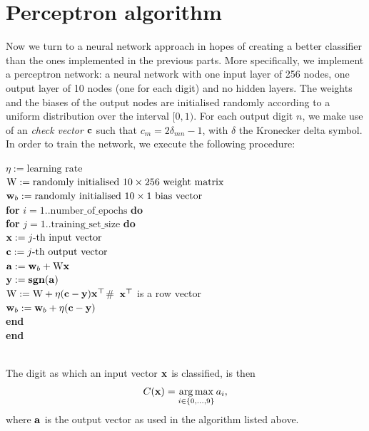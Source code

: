\documentclass[11pt]{article}
\DeclareMathOperator*{\argmax}{arg\,max}
\DeclareMathOperator{\vsgn}{{\bf sgn}}
\def\tab{\hspace*{1cm}}
\begin{document}
\section{Perceptron algorithm}
Now we turn to a neural network approach in hopes of creating a better classifier than the ones implemented in the previous parts. More specifically, we implement a perceptron network: a neural network with one input layer of 256 nodes, one output layer of 10 nodes (one for each digit) and no hidden layers. The weights and the biases of the output nodes are initialised randomly according to a uniform distribution over the interval $[0, 1)$. For each output digit $n$, we make use of an \textit{check vector} $\boldsymbol{\mathrm{c}}$ such that $c_m=2\delta_{mn}-1$, with $\delta$ the Kronecker delta symbol. In order to train the network, we execute the following procedure:\\
\sf
\begin{mdframed}
$\eta:=\text{learning rate}$\\
$\mathrm{W}:=\text{randomly initialised }10\times256\text{ weight matrix}$\\
$\boldsymbol{\mathrm{w}}_b:=\text{randomly initialised } 10\times1\text{ bias vector}$\\
\textbf{for} $i=1..\text{number\_of\_epochs}$ \textbf{do}\\
\tab\textbf{for} $j=1..\text{training\_set\_size}$ \textbf{do}\\
\tab\tab$\boldsymbol{\mathrm{x}}:=j\text{-th input vector}$\\
\tab\tab$\boldsymbol{\mathrm{c}}:=j\text{-th output vector}$\\
\tab\tab$\boldsymbol{\mathrm{a}}:=\boldsymbol{\mathrm{w}}_b+\mathrm{W}\boldsymbol{\mathrm{x}}$\\
\tab\tab$\vc{y}:=\vsgn(\vc{a})$\\
\tab\tab$\mathrm{W}:=\mathrm{W}+\eta(\boldsymbol{\mathrm{c}}-\boldsymbol{\mathrm{y}})\boldsymbol{\mathrm{x}}^{\boldsymbol\top}$\tab\#~$\boldsymbol{\mathrm{x}}^{\boldsymbol\top}$ is a row vector\\
\tab\tab$\boldsymbol{\mathrm{w}}_b:=\boldsymbol{\mathrm{w}}_b+\eta(\boldsymbol{\mathrm{c}}-\boldsymbol{\mathrm{y}})$\\
\tab\textbf{end}\\
\textbf{end}
\end{mdframed}$ $\\
\rm
The digit as which an input vector $\boldsymbol{\mathrm{x}}$ is classified, is then
\begin{align}
C(\vc{x})=\argmax_{i\in\{0,\ldots,9\}}a_i,
\end{align}
where $\boldsymbol{\mathrm{a}}$ is the output vector as used in the algorithm listed above.\par
\end{document}
